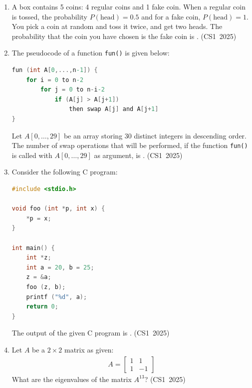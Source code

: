 \begin{enumerate}[label=\thesubsection.\arabic*, ref=\thesubsection.\theenumi]
\item A box contains 5 coins: 4 regular coins and 1 fake coin. When a regular coin is tossed, the probability $P(\text{head})=0.5$ and for a fake coin, $P(\text{head})=1$. You pick a coin at random and toss it twice, and get two heads. The probability that the coin you have chosen is the fake coin is \underline{\hspace{1cm}}.
\hfill (CS1~2025)

\item The pseudocode of a function \texttt{fun()} is given below:
\begin{lstlisting}[language=C]
fun (int A[0,...,n-1]) {
    for i = 0 to n-2
        for j = 0 to n-i-2
            if (A[j] > A[j+1])
                then swap A[j] and A[j+1]
}
\end{lstlisting}
Let $A[0,\dots,29]$ be an array storing 30 distinct integers in descending order. The number of swap operations that will be performed, if the function \texttt{fun()} is called with $A[0,\dots,29]$ as argument, is \underline{\hspace{1cm}}.
\hfill (CS1~2025)

\item Consider the following C program:
\begin{lstlisting}[language=C]
#include <stdio.h>

void foo (int *p, int x) {
    *p = x;
}

int main() {
    int *z;
    int a = 20, b = 25;
    z = &a;
    foo (z, b);
    printf ("%d", a);
    return 0;
}
\end{lstlisting}
The output of the given C program is \underline{\hspace{1cm}}.
\hfill (CS1~2025)

\item Let $A$ be a $2\times2$ matrix as given:
\begin{align*}
A = \begin{bmatrix} 1 & 1 \\ 1 & -1 \end{bmatrix}
\end{align*}
What are the eigenvalues of the matrix $A^{13}$?
\hfill (CS1~2025)
\begin{enumerate}
	\begin{multicols}{2}
    \item $1, -1$
    \item $2\sqrt{2}, -2\sqrt{2}$
    \item $4\sqrt{2}, -4\sqrt{2}$
    \item $64\sqrt{2}, -64\sqrt{2}$
	\end{multicols}
\end{enumerate}


\end{enumerate}
